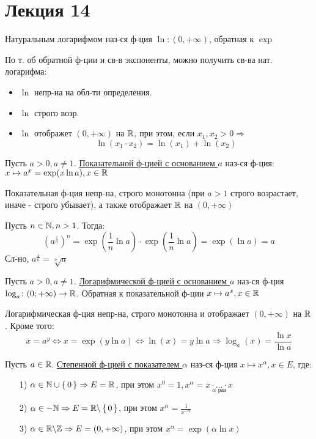 \section{Лекция 14}
\begin{definition}
Натуральным логарифмом наз-ся ф-ция $\ln \colon (0, +\infty)$, обратная к $\exp$
\end{definition}
\begin{note}
По т. об обратной ф-ции и св-в экспоненты, можно получить св-ва нат. логарифма:
\begin{itemize}
  \item $\ln$ непр-на на обл-ти определения.
  \item $\ln$ строго возр.
  \item $\ln$ отображет $(0, +\infty)$ на $\mathbb{R}$, при этом, если $x_1, x_2 > 0 \Rightarrow$
    \[
    \ln(x_1 \cdot x_2) = \ln (x_1) + \ln (x_2)
    \]
\end{itemize}
\end{note}
\begin{definition}
Пусть $a > 0, a \neq 1$. \underline{Показательной ф-цией с основанием $a$} наз-ся ф-ция: $x \mapsto a^{x} = \exp(x\ln a), x \in \mathbb{R}$
\end{definition}
\begin{note}
Показательная ф-ция непр-на, строго монотонна (при $a > 1$ строго возрастает, иначе - строго убывает), а также отображает $\mathbb{R}$ на $(0, +\infty)$
\end{note}
\begin{note}
Пусть $n \in \mathbb{N}, n > 1$. Тогда:
\[
  \left(a^{\frac{1}{n}}\right)^{n} = \exp(\frac{1}{n}\ln a) \cdot \exp(\frac{1}{n}\ln a) = \exp(\ln a) = a
\]
Сл-но, $a^{\frac{1}{n}} = \sqrt[n]{a}$
\end{note}
\begin{definition}
Пусть $a > 0, a \neq 1$. \underline{Логарифмической ф-цией с основанием $a$} наз-ся ф-ция $\log_a \colon (0; +\infty) \rightarrow \mathbb{R}$. Обратная к показательной ф-ции $x \mapsto a^{x}, x \in \mathbb{R}$
\end{definition}
\begin{note}
Логарифмическая ф-ция непр-на, строго монотонна и отображает $(0, +\infty)$ на $\mathbb{R}$. Кроме того:
\[
x = a^{y} \iff x = \exp(y\ln a) \iff \ln(x) = y\ln a \Rightarrow \log_a(x) = \frac{\ln x}{\ln a}
\]
\end{note}
\begin{definition}
Пусть $a \in \mathbb{R}$. \underline{Степенной ф-цией с показателем $\alpha$} наз-ся ф-ция $x \mapsto x^{\alpha}, x \in E$, где:
\begin{itemize}
  \item [1) ] $\alpha \in \mathbb{N} \cup \set{0} \Rightarrow E = \mathbb{R}$, при этом $x^{0} = 1, x^{\alpha} = \underset{\alpha \text{ раз}}{x \cdot \ldots \cdot x}$
  \item [2) ] $\alpha \in -\mathbb{N} \Rightarrow E = \mathbb{R} \backslash \set{0}$, при этом $x^{\alpha} = \frac{1}{x^{-\alpha}}$
  \item [3) ] $\alpha \in \mathbb{R} \backslash \mathbb{Z} \Rightarrow E = (0, +\infty)$, при этом $x^{\alpha} = \exp(\alpha\ln x)$
\end{itemize}
\end{definition}
